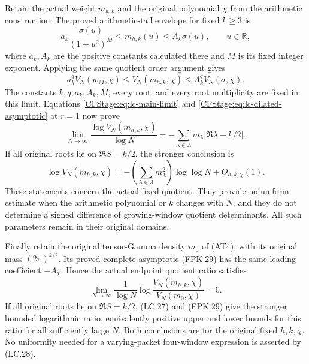 Retain the actual weight $m_{h,k}$ and the original polynomial $\chi$ from
the arithmetic construction. The proved arithmetic-tail envelope for fixed
$k\ge3$ is
\[
 a_k\frac{\sigma(u)}{(1+u^2)^M}
 \le m_{h,k}(u)\le A_k\sigma(u),
 \qquad u\in\mathbb R,
 \tag{LC.24}\label{CFStage:eq:lc-arithmetic-envelope}
\]
where $a_k,A_k$ are the positive constants calculated there and $M$ is its
fixed integer exponent. Applying the same quotient order argument gives
\[
 a_k^qV_N(w_M,\chi)
 \le V_N(m_{h,k},\chi)\le A_k^qV_N(\sigma,\chi).
 \tag{LC.25}\label{CFStage:eq:lc-arithmetic-sandwich}
\]
The constants $k,q,a_k,A_k,M$, every root, and every root multiplicity are
fixed in this limit. Equations \eqref{CFStage:eq:lc-main-limit} and
\eqref{CFStage:eq:lc-dilated-asymptotic} at $r=1$ now prove
\[
 \boxed{\displaystyle
 \lim_{N\to\infty}\frac{\log V_N(m_{h,k},\chi)}{\log N}
 =-\sum_{\lambda\in\Lambda}m_\lambda|\Re\lambda-k/2|.}
 \tag{LC.26}\label{CFStage:eq:lc-actual-limit}
\]
If all original roots lie on $\Re S=k/2$, the stronger conclusion is
\[
 \log V_N(m_{h,k},\chi)
 =-\left(\sum_{\lambda\in\Lambda}m_\lambda^2\right)
 \log\log N+O_{h,k,\chi}(1).
 \tag{LC.27}\label{CFStage:eq:lc-actual-critical-law}
\]
These statements concern the actual fixed quotient. They provide no
uniform estimate when the arithmetic polynomial or $k$ changes with $N$,
and they do not determine a signed difference of growing-window quotient
determinants. All such parameters remain in their original domains.

Finally retain the original tensor-Gamma density $m_0$ of (AT4),
with its original mass $(2\pi)^{k/2}$. Its proved complete asymptotic
(FPK.29) has the same leading coefficient $-A_\chi$. Hence the
actual endpoint quotient ratio satisfies
\[
 \lim_{N\to\infty}\frac{1}{\log N}
       \log\frac{V_N(m_{h,k},\chi)}{V_N(m_0,\chi)}=0.
 \tag{LC.28}\label{CFStage:eq:lc-original-reference-ratio}
\]
If all original roots lie on $\Re S=k/2$, (LC.27) and (FPK.29)
give the stronger bounded logarithmic ratio, equivalently positive
upper and lower bounds for this ratio for all sufficiently large $N$.
Both conclusions are for the original fixed $h,k,\chi$. No
uniformity needed for a varying-packet four-window expression is
asserted by (LC.28).
